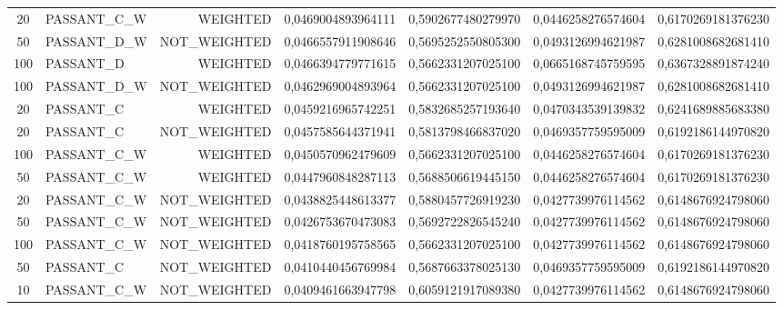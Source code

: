 \begin{table}[H]
{\begin{tabular}{ c l r c c c c }
				20 & PASSANT\_C\_W &   WEIGHTED & 0,0469004893964111 & 0,5902677480279970 & 0,0446258276574604 & 0,6170269181376230 \\
				
				50 & PASSANT\_D\_W & NOT\_WEIGHTED & 0,0466557911908646 & 0,5695252550805300 & 0,0493126994621987 & 0,6281008682681410 \\
				
				100 &  PASSANT\_D &   WEIGHTED & 0,0466394779771615 & 0,5662331207025100 & 0,0665168745759595 & 0,6367328891874240 \\
				
				100 & PASSANT\_D\_W & NOT\_WEIGHTED & 0,0462969004893964 & 0,5662331207025100 & 0,0493126994621987 & 0,6281008682681410 \\
				
				20 &  PASSANT\_C &   WEIGHTED & 0,0459216965742251 & 0,5832685257193640 & 0,0470343539139832 & 0,6241689885683380 \\
				
				20 &  PASSANT\_C & NOT\_WEIGHTED & 0,0457585644371941 & 0,5813798466837020 & 0,0469357759595009 & 0,6192186144970820 \\
				
				100 & PASSANT\_C\_W &   WEIGHTED & 0,0450570962479609 & 0,5662331207025100 & 0,0446258276574604 & 0,6170269181376230 \\
				
				50 & PASSANT\_C\_W &   WEIGHTED & 0,0447960848287113 & 0,5688506619445150 & 0,0446258276574604 & 0,6170269181376230 \\
				
				20 & PASSANT\_C\_W & NOT\_WEIGHTED & 0,0438825448613377 & 0,5880457726919230 & 0,0427739976114562 & 0,6148676924798060 \\
				
				50 & PASSANT\_C\_W & NOT\_WEIGHTED & 0,0426753670473083 & 0,5692722826545240 & 0,0427739976114562 & 0,6148676924798060 \\
				
				100 & PASSANT\_C\_W & NOT\_WEIGHTED & 0,0418760195758565 & 0,5662331207025100 & 0,0427739976114562 & 0,6148676924798060 \\
				
				50 &  PASSANT\_C & NOT\_WEIGHTED & 0,0410440456769984 & 0,5687663378025130 & 0,0469357759595009 & 0,6192186144970820 \\
				
				10 & PASSANT\_C\_W & NOT\_WEIGHTED & 0,0409461663947798 & 0,6059121917089380 & 0,0427739976114562 & 0,6148676924798060 \\
				

\end{tabular}}
\end{table}
